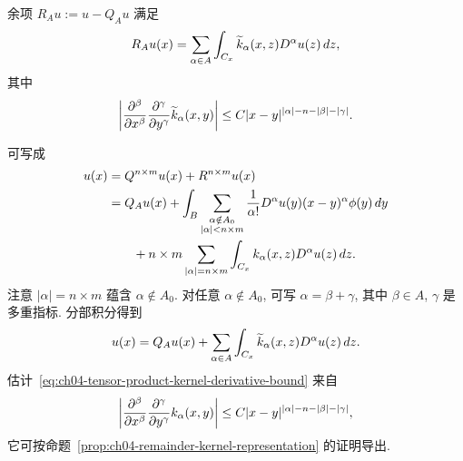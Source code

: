 \setcounter{thmcount}{3}
\begin{Proposition}
\label{prop:ch04-tensor-product-remainder-representation}
余项 $R_Au:=u-Q_Au$ 满足
\begin{equation}
\MathBookFormulaID{formula-ch04-tensor-product-remainder-representation}
\label{eq:ch04-tensor-product-remainder-representation}
R_Au(x)=\sum_{\alpha\in A}\int_{C_x}\widetilde k_\alpha(x,z)D^\alpha u(z)\,dz,
\end{equation}
其中
\begin{equation}
\MathBookFormulaID{formula-ch04-tensor-product-kernel-derivative-bound}
\label{eq:ch04-tensor-product-kernel-derivative-bound}
\left|\frac{\partial^\beta}{\partial x^\beta}
\frac{\partial^\gamma}{\partial y^\gamma}\widetilde k_\alpha(x,y)\right|
\leq C|x-y|^{|\alpha|-n-|\beta|-|\gamma|}.
\end{equation}
\end{Proposition}
\begin{Proof}
可写成
\begin{equation}
\MathBookFormulaID{formula-ch04-tensor-product-remainder-high-order}
\label{eq:ch04-tensor-product-remainder-high-order}
\begin{aligned}
u(x)
&=Q^{n\times m}u(x)+R^{n\times m}u(x)\\
&=Q_Au(x)+\int_B\sum_{\substack{\alpha\notin A_0\\|\alpha|<n\times m}}
\frac1{\alpha!}D^\alpha u(y)(x-y)^\alpha\phi(y)\,dy\\
&\qquad+n\times m\sum_{|\alpha|=n\times m}
\int_{C_x}k_\alpha(x,z)D^\alpha u(z)\,dz.
\end{aligned}
\end{equation}
注意 $|\alpha|=n\times m$ 蕴含 $\alpha\notin A_0$. 对任意 $\alpha\notin A_0$, 可写 $\alpha=\beta+\gamma$, 其中 $\beta\in A$, $\gamma$ 是多重指标. 分部积分得到
\begin{equation}
\MathBookFormulaID{formula-ch04-tensor-product-remainder-after-integration-by-parts}
\label{eq:ch04-tensor-product-remainder-after-integration-by-parts}
u(x)=Q_Au(x)+\sum_{\alpha\in A}\int_{C_x}
\widetilde k_\alpha(x,z)D^\alpha u(z)\,dz.
\end{equation}
估计~\eqref{eq:ch04-tensor-product-kernel-derivative-bound} 来自
\[
\MathBookFormulaID{formula-ch04-tensor-product-kernel-proof-bound}
\left|\frac{\partial^\beta}{\partial x^\beta}
\frac{\partial^\gamma}{\partial y^\gamma}k_\alpha(x,y)\right|
\leq C|x-y|^{|\alpha|-n-|\beta|-|\gamma|},
\]
它可按命题~\ref{prop:ch04-remainder-kernel-representation} 的证明导出.
\end{Proof}

